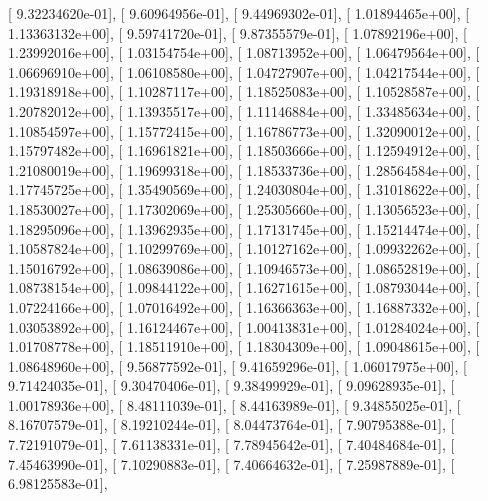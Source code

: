 \documentclass{article}
\begin{document}
       [  9.32234620e-01],
       [  9.60964956e-01],
       [  9.44969302e-01],
       [  1.01894465e+00],
       [  1.13363132e+00],
       [  9.59741720e-01],
       [  9.87355579e-01],
       [  1.07892196e+00],
       [  1.23992016e+00],
       [  1.03154754e+00],
       [  1.08713952e+00],
       [  1.06479564e+00],
       [  1.06696910e+00],
       [  1.06108580e+00],
       [  1.04727907e+00],
       [  1.04217544e+00],
       [  1.19318918e+00],
       [  1.10287117e+00],
       [  1.18525083e+00],
       [  1.10528587e+00],
       [  1.20782012e+00],
       [  1.13935517e+00],
       [  1.11146884e+00],
       [  1.33485634e+00],
       [  1.10854597e+00],
       [  1.15772415e+00],
       [  1.16786773e+00],
       [  1.32090012e+00],
       [  1.15797482e+00],
       [  1.16961821e+00],
       [  1.18503666e+00],
       [  1.12594912e+00],
       [  1.21080019e+00],
       [  1.19699318e+00],
       [  1.18533736e+00],
       [  1.28564584e+00],
       [  1.17745725e+00],
       [  1.35490569e+00],
       [  1.24030804e+00],
       [  1.31018622e+00],
       [  1.18530027e+00],
       [  1.17302069e+00],
       [  1.25305660e+00],
       [  1.13056523e+00],
       [  1.18295096e+00],
       [  1.13962935e+00],
       [  1.17131745e+00],
       [  1.15214474e+00],
       [  1.10587824e+00],
       [  1.10299769e+00],
       [  1.10127162e+00],
       [  1.09932262e+00],
       [  1.15016792e+00],
       [  1.08639086e+00],
       [  1.10946573e+00],
       [  1.08652819e+00],
       [  1.08738154e+00],
       [  1.09844122e+00],
       [  1.16271615e+00],
       [  1.08793044e+00],
       [  1.07224166e+00],
       [  1.07016492e+00],
       [  1.16366363e+00],
       [  1.16887332e+00],
       [  1.03053892e+00],
       [  1.16124467e+00],
       [  1.00413831e+00],
       [  1.01284024e+00],
       [  1.01708778e+00],
       [  1.18511910e+00],
       [  1.18304309e+00],
       [  1.09048615e+00],
       [  1.08648960e+00],
       [  9.56877592e-01],
       [  9.41659296e-01],
       [  1.06017975e+00],
       [  9.71424035e-01],
       [  9.30470406e-01],
       [  9.38499929e-01],
       [  9.09628935e-01],
       [  1.00178936e+00],
       [  8.48111039e-01],
       [  8.44163989e-01],
       [  9.34855025e-01],
       [  8.16707579e-01],
       [  8.19210244e-01],
       [  8.04473764e-01],
       [  7.90795388e-01],
       [  7.72191079e-01],
       [  7.61138331e-01],
       [  7.78945642e-01],
       [  7.40484684e-01],
       [  7.45463990e-01],
       [  7.10290883e-01],
       [  7.40664632e-01],
       [  7.25987889e-01],
       [  6.98125583e-01],
\end{document}
